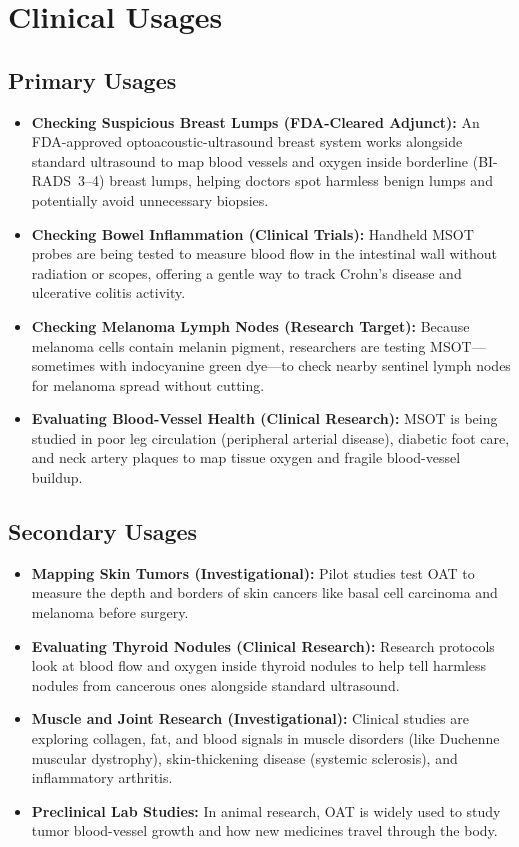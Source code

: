 \section{Clinical Usages}

\subsection{Primary Usages}
\begin{itemize}
  \item \textbf{Checking Suspicious Breast Lumps (FDA-Cleared Adjunct):} An FDA-approved optoacoustic-ultrasound breast system works alongside standard ultrasound to map blood vessels and oxygen inside borderline (BI-RADS~3--4) breast lumps, helping doctors spot harmless benign lumps and potentially avoid unnecessary biopsies.
  \item \textbf{Checking Bowel Inflammation (Clinical Trials):} Handheld MSOT probes are being tested to measure blood flow in the intestinal wall without radiation or scopes, offering a gentle way to track Crohn's disease and ulcerative colitis activity.
  \item \textbf{Checking Melanoma Lymph Nodes (Research Target):} Because melanoma cells contain melanin pigment, researchers are testing MSOT---sometimes with indocyanine green dye---to check nearby sentinel lymph nodes for melanoma spread without cutting.
  \item \textbf{Evaluating Blood-Vessel Health (Clinical Research):} MSOT is being studied in poor leg circulation (peripheral arterial disease), diabetic foot care, and neck artery plaques to map tissue oxygen and fragile blood-vessel buildup.
\end{itemize}

\subsection{Secondary Usages}
\begin{itemize}
  \item \textbf{Mapping Skin Tumors (Investigational):} Pilot studies test OAT to measure the depth and borders of skin cancers like basal cell carcinoma and melanoma before surgery.
  \item \textbf{Evaluating Thyroid Nodules (Clinical Research):} Research protocols look at blood flow and oxygen inside thyroid nodules to help tell harmless nodules from cancerous ones alongside standard ultrasound.
  \item \textbf{Muscle and Joint Research (Investigational):} Clinical studies are exploring collagen, fat, and blood signals in muscle disorders (like Duchenne muscular dystrophy), skin-thickening disease (systemic sclerosis), and inflammatory arthritis.
  \item \textbf{Preclinical Lab Studies:} In animal research, OAT is widely used to study tumor blood-vessel growth and how new medicines travel through the body.
\end{itemize}

